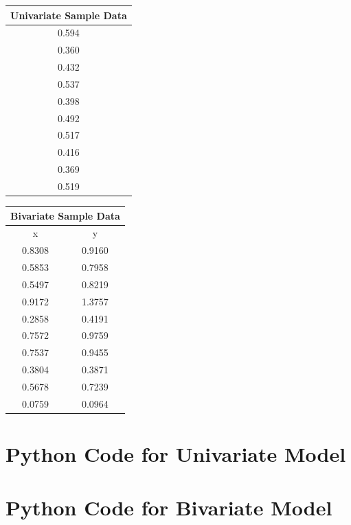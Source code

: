 \documentclass[a4paper,11pt,twoside]{article}
\begin{document}
\begin{tabular}[t]{|c|}
	\hline
	Univariate Sample Data \\
	\hline
	0.594 \\
	0.360 \\
	0.432 \\
	0.537 \\
	0.398 \\
	0.492 \\
	0.517 \\
	0.416 \\
	0.369 \\
	0.519 \\
	\hline
\end{tabular}
\quad
\begin{tabular}[t]{|c|c|}
	\hline
	\multicolumn{2}{|c|}{Bivariate Sample Data} \\
	\hline
	x & y \\ 
	\hline 
	0.8308 & 0.9160 \\
	0.5853 & 0.7958 \\
	0.5497 & 0.8219 \\
	0.9172 & 1.3757 \\
	0.2858 & 0.4191 \\
	0.7572 & 0.9759 \\
	0.7537 & 0.9455 \\
	0.3804 & 0.3871 \\
	0.5678 & 0.7239 \\
	0.0759 & 0.0964 \\
	\hline
\end{tabular}
	
\section{Python Code for Univariate Model} 
\label{sec:onedcode}
%

\section{Python Code for Bivariate Model}
\label{sec:twodcode}
%
\end{document}
